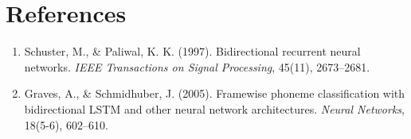 \documentclass[11pt,a4paper]{article}
\theoremstyle{definition}
\begin{document}
\section{References}
\begin{enumerate}
    \item Schuster, M., \& Paliwal, K. K. (1997). Bidirectional recurrent neural networks. \emph{IEEE Transactions on Signal Processing}, 45(11), 2673--2681.
    \item Graves, A., \& Schmidhuber, J. (2005). Framewise phoneme classification with bidirectional LSTM and other neural network architectures. \emph{Neural Networks}, 18(5-6), 602--610.
\end{enumerate}
\end{document}
